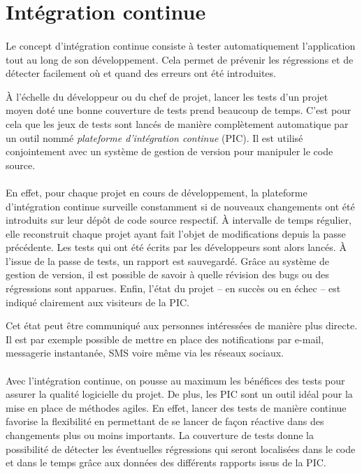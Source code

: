 \section{Intégration continue}

\paragraph{}
Le concept d'intégration continue consiste à tester automatiquement l'application tout au long de son développement.
Cela permet de prévenir les régressions et de détecter facilement où et quand des erreurs ont été introduites.

À l'échelle du développeur ou du chef de projet, lancer les tests d'un projet moyen doté une bonne couverture de tests prend beaucoup de temps.
C'est pour cela que les jeux de tests sont lancés de manière complètement automatique par un outil nommé \emph{plateforme d'intégration continue} (PIC).
Il est utilisé conjointement avec un système de gestion de version pour manipuler le code source.

\paragraph{}
En effet, pour chaque projet en cours de développement, la plateforme d'intégration continue surveille constamment si de nouveaux changements ont été introduits sur leur dépôt de code source respectif.
À intervalle de temps régulier, elle reconstruit chaque projet ayant fait l'objet de modifications depuis la passe précédente.
Les tests qui ont été écrits par les développeurs sont alors lancés.
À l'issue de la passe de tests, un rapport est sauvegardé.
Grâce au système de gestion de version, il est possible de savoir à quelle révision des bugs ou des régressions sont apparues.
 Enfin, l'état du projet -- en succès ou en échec -- est indiqué clairement aux visiteurs de la PIC.

Cet état peut être communiqué aux personnes intéressées de manière plus directe.
Il est par exemple possible de mettre en place des notifications par e-mail, messagerie instantanée, SMS voire même via les réseaux sociaux.

\paragraph{}
Avec l'intégration continue, on pousse au maximum les bénéfices des tests pour assurer la qualité logicielle du projet.
De plus, les PIC sont un outil idéal pour la mise en place de méthodes agiles.
En effet, lancer des tests de manière continue favorise la flexibilité en permettant de se lancer de façon réactive dans des changements plus ou moins importants.
La couverture de tests donne la possibilité de détecter les éventuelles régressions qui seront localisées dans le code et dans le temps grâce aux données des différents rapports issus de la PIC.



